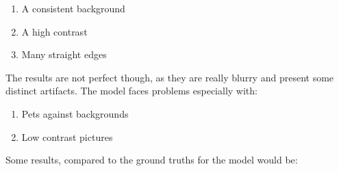 \documentclass[conference]{IEEEtran}
\begin{document}
\begin{enumerate}
    \item A consistent background
    \item A high contrast
    \item Many straight edges
\end{enumerate}

The results are not perfect though, as they are really blurry and present some distinct artifacts. The model faces problems
especially with:

\begin{enumerate}
    \item Pets against backgrounds
    \item Low contrast pictures
\end{enumerate}

Some results, compared to the ground truths for the model would be:
\end{document}
